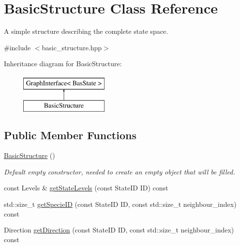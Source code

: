 \hypertarget{classBasicStructure}{\section{\-Basic\-Structure \-Class \-Reference}
\label{classBasicStructure}
}


\-A simple structure describing the complete state space.  




{\ttfamily \#include $<$basic\-\_\-structure.\-hpp$>$}

\-Inheritance diagram for \-Basic\-Structure\-:\begin{figure}[H]
\begin{center}
\leavevmode
\includegraphics[height=2.000000cm]{classBasicStructure}
\end{center}
\end{figure}
\subsection*{\-Public \-Member \-Functions}
\begin{DoxyCompactItemize}
\item 
\hypertarget{classBasicStructure_ae2069c7d1d75da4f17093dc50aa35c8c}{\hyperlink{classBasicStructure_ae2069c7d1d75da4f17093dc50aa35c8c}{\-Basic\-Structure} ()}\label{classBasicStructure_ae2069c7d1d75da4f17093dc50aa35c8c}

\begin{DoxyCompactList}\small\item\em \-Default empty constructor, needed to create an empty object that will be filled. \end{DoxyCompactList}\item 
const \-Levels \& \hyperlink{classBasicStructure_a16e4995e8983e3882015158ef3141dba}{get\-State\-Levels} (const \-State\-I\-D \-I\-D) const 
\item 
std\-::size\-\_\-t \hyperlink{classBasicStructure_abba9142ad864c119a657a7c4ea84e074}{get\-Specie\-I\-D} (const \-State\-I\-D \-I\-D, const std\-::size\-\_\-t neighbour\-\_\-index) const 
\item 
\-Direction \hyperlink{classBasicStructure_af6bd4e6df2c4fee49d372bc9455543ac}{get\-Direction} (const \-State\-I\-D \-I\-D, const std\-::size\-\_\-t neighbour\-\_\-index) const 
\end{DoxyCompactItemize}
